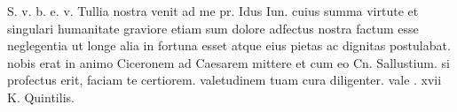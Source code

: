 


S. v. b. e. v.  Tullia nostra venit ad me pr. Idus Iun. cuius summa virtute et singulari humanitate graviore etiam sum dolore adfectus nostra factum esse neglegentia ut longe alia in fortuna esset atque eius pietas ac dignitas postulabat. nobis erat in animo Ciceronem ad Caesarem mittere et cum eo Cn. Sallustium. si profectus erit, faciam te certiorem. valetudinem tuam cura diligenter. vale . xvii K. Quintilis.
